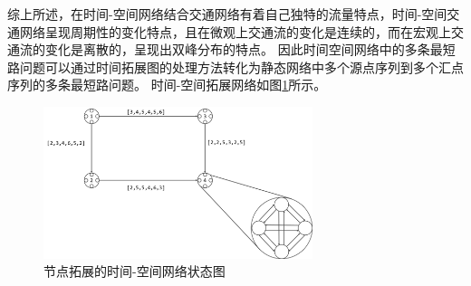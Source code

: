 综上所述，在时间-空间网络结合交通网络有着自己独特的流量特点，时间-空间交通网络呈现周期性的变化特点，且在微观上交通流的变化是连续的，而在宏观上交通流的变化是离散的，呈现出双峰分布的特点。
因此时间空间网络中的多条最短路问题可以通过时间拓展图的处理方法转化为静态网络中多个源点序列到多个汇点序列的多条最短路问题。
时间-空间拓展网络如图\ref{fig:fig11}所示。

\begin{figure}[H] %
    \centering %
    \includegraphics[width=0.7\textwidth]{png/图片11 节点拓展的时间-空间网络状态图} %
    \caption{节点拓展的时间-空间网络状态图} %
    \label{fig:fig11} %
\end{figure}